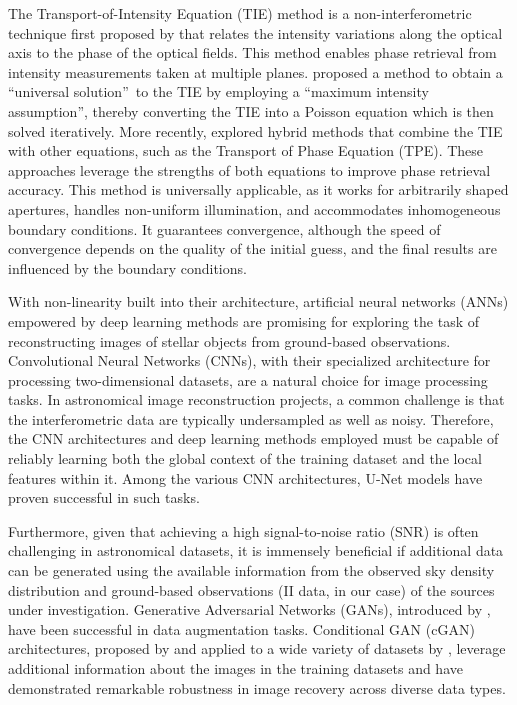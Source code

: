 The Transport-of-Intensity Equation (TIE) method is a non-interferometric technique first proposed by \cite{Teague1983} that relates the intensity variations along the optical axis to the phase of the optical fields. This method enables phase retrieval from intensity measurements taken at multiple planes. \cite{Zhang2020} proposed a method to obtain a \textquotedblleft universal solution\textquotedblright\ to the TIE by employing a \textquotedblleft maximum intensity assumption\textquotedblright, thereby converting the TIE into a Poisson equation which is then solved iteratively. More recently, \cite{Kirisits2024} explored hybrid methods that combine the TIE with other equations, such as the Transport of Phase Equation (TPE). These approaches leverage the strengths of both equations to improve phase retrieval accuracy. This method is universally applicable, as it works for arbitrarily shaped apertures, handles non-uniform illumination, and accommodates inhomogeneous boundary conditions. It guarantees convergence, although the speed of convergence depends on the quality of the initial guess, and the final results are influenced by the boundary conditions.

With non-linearity built into their architecture, artificial neural networks (ANNs) empowered by deep learning methods are promising for exploring the task of reconstructing images of stellar objects from ground-based observations. Convolutional Neural Networks (CNNs), with their specialized architecture for processing two-dimensional datasets, are a natural choice for image processing tasks. In astronomical image reconstruction projects, a common challenge is that the interferometric data are typically undersampled as well as noisy.  Therefore, the CNN architectures and deep learning methods employed must be capable of reliably learning both the global context of the training dataset and the local features within it. Among the various CNN architectures, U-Net models \citep{ronneberger2015u} have proven successful in such tasks.

Furthermore, given that achieving a high signal-to-noise ratio (SNR) is often challenging in astronomical datasets, it is immensely beneficial if additional data can be generated using the available information from the observed sky density distribution and ground-based observations (II data, in our case) of the sources under investigation. Generative Adversarial Networks (GANs), introduced by \cite{goodfellow2014generative}, have been successful in data augmentation tasks. Conditional GAN (cGAN) architectures, proposed by \cite{mirza2014conditional} and applied to a wide variety of datasets by \cite{isola2017image}, leverage additional information about the images in the training datasets and have demonstrated remarkable robustness in image recovery across diverse data types.

